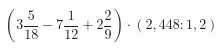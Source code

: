 \begin{ex}[type=calculate]
	\begin{condition}
		\( \left( 3\dfrac{5}{18}-7\dfrac{1}{12}+2\dfrac{2}{9} \right)\cdot(2,448:1,2) \)
	\end{condition}
\end{ex}